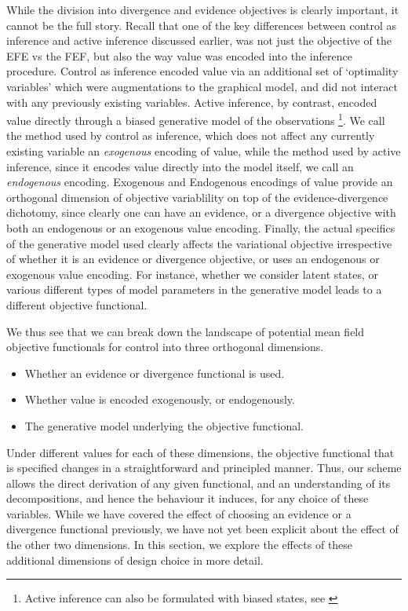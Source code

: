 While the division into divergence and evidence objectives is clearly important, it cannot be the full story. Recall that one of the key differences between control as inference and active inference discussed earlier, was not just the objective of the EFE vs the FEF, but also the way value was encoded into the inference procedure. Control as inference encoded value via an additional set of `optimality variables' which were augmentations to the graphical model, and did not interact with any previously existing variables. Active inference, by contrast, encoded value directly through a biased generative model of the observations \footnote{Active inference can also be formulated with biased states, see  \citep{da2020active}}. We call the method used by control as inference, which does not affect any currently existing variable an \emph{exogenous} encoding of value, while the method used by active inference, since it encodes value directly into the model itself, we call an \emph{endogenous} encoding. Exogenous and Endogenous encodings of value provide an orthogonal dimension of objective variablility on top of the evidence-divergence dichotomy, since clearly one can have an evidence, or a divergence objective with both an endogenous or an exogenous value encoding. Finally, the actual specifics of the generative model used clearly affects the variational objective irrespective of whether it is an evidence or divergence objective, or uses an endogenous or exogenous value encoding. For instance, whether we consider latent states, or various different types of model parameters in the generative model leads to a different objective functional. 

We thus see that we can break down the landscape of potential mean field objective functionals for control into three orthogonal dimensions. 
\begin{itemize}
    \item Whether an evidence or divergence functional is used.
    \item Whether value is encoded exogenously, or endogenously.
    \item The generative model underlying the objective functional.
\end{itemize}


Under different values for each of these dimensions, the objective functional that is specified changes in a straightforward and principled manner. Thus, our scheme allows the direct derivation of any given functional, and an understanding of its decompositions, and hence the behaviour it induces, for any choice of these variables. While we have covered the effect of choosing an evidence or a divergence functional previously, we have not yet been explicit about the effect of the other two dimensions. In this section, we explore the effects of these additional dimensions of design choice in more detail.


